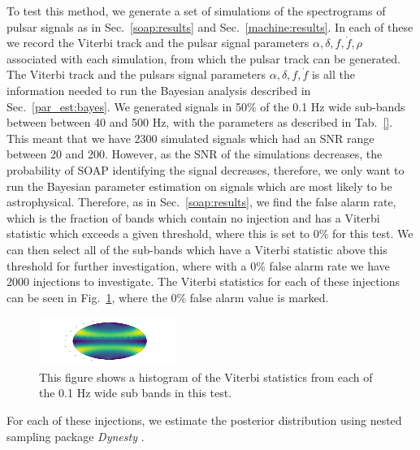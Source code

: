 To test this method, we generate a set of simulations of the spectrograms of pulsar signals as in Sec.~\ref{soap:results} and Sec.~\ref{machine:results}.
In each of these we record the Viterbi track and the pulsar signal parameters $\alpha, \delta, f, \dot{f} , \rho$ associated with each simulation, from which the pulsar track can be generated.
The Viterbi track and the pulsars signal parameters $\alpha, \delta, f, \dot{f}$ is all the information needed to run the Bayesian analysis described in Sec.~\ref{par_est:bayes}.
We generated signals in 50\% of the 0.1 Hz wide sub-bands between between 40 and 500 Hz, with the parameters as described in Tab.~\ref{}. 
This meant that we have 2300 simulated signals which had an \gls{SNR} range between 20 and 200.
However, as the \gls{SNR} of the simulations decreases, the probability of SOAP identifying the signal decreases, therefore, we only want to run the Bayesian parameter estimation on signals which are most likely to be astrophysical.
Therefore, as in Sec.~\ref{soap:results}, we find the false alarm rate, which is the fraction of bands which contain no injection and has a Viterbi statistic which exceeds a given threshold, where this is set to 0\% for this test.
We can then select all of the sub-bands which have a Viterbi statistic above this threshold for further investigation, where with a 0\% false alarm rate we have 2000  injections to investigate.
The Viterbi statistics for each of these injections can be seen in Fig.~\ref{par_est:results:all_viterbi}, where the 0\% false alarm value is marked.
%
\begin{figure}
    \centering
    \includegraphics[width=\linewidth]{testimg.png}
    \caption[All Viterbi statistics]{This figure shows a histogram of the Viterbi statistics from each of the 0.1 Hz wide sub bands in this test. }
    \label{par_est:results:all_viterbi}
\end{figure}

For each of these injections, we estimate the posterior distribution using nested sampling package \textit{Dynesty} \citep{}. 

